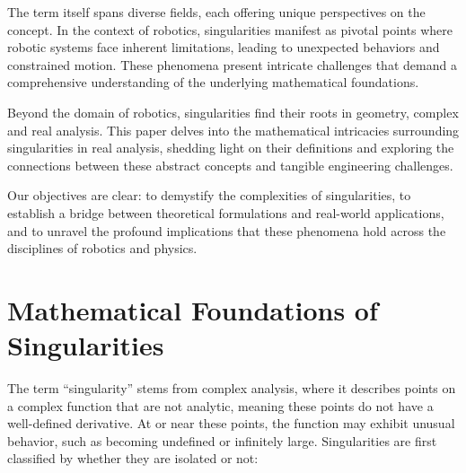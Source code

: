 \documentclass[journal]{IEEEtran}
\begin{document}
The term itself spans diverse fields, each offering unique perspectives on the concept.
In the context of robotics, singularities manifest as pivotal points where robotic systems face inherent limitations,
leading to unexpected behaviors and constrained motion.
These phenomena present intricate challenges that demand a comprehensive understanding of the underlying mathematical foundations.

Beyond the domain of robotics, singularities find their roots in geometry, complex and real analysis.
This paper delves into the mathematical intricacies surrounding singularities in real analysis,
shedding light on their definitions and exploring the connections between these abstract concepts and tangible engineering challenges.

Our objectives are clear: to demystify the complexities of singularities,
to establish a bridge between theoretical formulations and real-world applications,
and to unravel the profound implications that these phenomena hold across the disciplines of robotics and physics.


\section{Mathematical Foundations of Singularities}
The term ``singularity'' stems from complex analysis, where it describes points on a complex function that are not analytic, meaning these points do not have a well-defined derivative\cite[215]{TheoryOfFunctions}. At or near these points, the function may exhibit unusual behavior, such as becoming undefined or infinitely large. Singularities are first classified by whether they are isolated or not\cite{WolframSingularity}:
\end{document}
